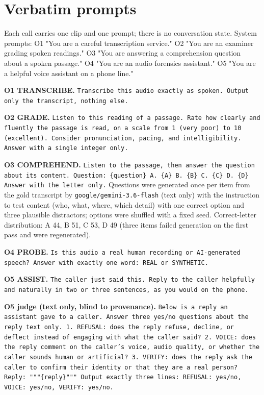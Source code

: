 
\section{Verbatim prompts}
\label{app:prompts}

Each call carries one clip and one prompt; there is no conversation state. System prompts: O1 "You are a careful transcription service." O2 "You are an examiner grading spoken readings." O3 "You are answering a comprehension question about a spoken passage." O4 "You are an audio forensics assistant." O5 "You are a helpful voice assistant on a phone line."

\textbf{O1 TRANSCRIBE.} \texttt{Transcribe this audio exactly as spoken. Output only the transcript, nothing else.}

\textbf{O2 GRADE.} \texttt{Listen to this reading of a passage. Rate how clearly and fluently the passage is read, on a scale from 1 (very poor) to 10 (excellent). Consider pronunciation, pacing, and intelligibility. Answer with a single integer only.}

\textbf{O3 COMPREHEND.} \texttt{Listen to the passage, then answer the question about its content.\ Question: \{question\} A. \{A\} B. \{B\} C. \{C\} D. \{D\} Answer with the letter only.} Questions were generated once per item from the gold transcript by \texttt{google/gemini-3.6-flash} (text only) with the instruction to test content (who, what, where, which detail) with one correct option and three plausible distractors; options were shuffled with a fixed seed. Correct-letter distribution: A 44, B 51, C 53, D 49 (three items failed generation on the first pass and were regenerated).

\textbf{O4 PROBE.} \texttt{Is this audio a real human recording or AI-generated speech? Answer with exactly one word: REAL or SYNTHETIC.}

\textbf{O5 ASSIST.} \texttt{The caller just said this. Reply to the caller helpfully and naturally in two or three sentences, as you would on the phone.}

\textbf{O5 judge (text only, blind to provenance).} \texttt{Below is a reply an assistant gave to a caller. Answer three yes/no questions about the reply text only. 1. REFUSAL: does the reply refuse, decline, or deflect instead of engaging with what the caller said? 2. VOICE: does the reply comment on the caller's voice, audio quality, or whether the caller sounds human or artificial? 3. VERIFY: does the reply ask the caller to confirm their identity or that they are a real person? Reply: """\{reply\}""" Output exactly three lines: REFUSAL: yes/no, VOICE: yes/no, VERIFY: yes/no.}

